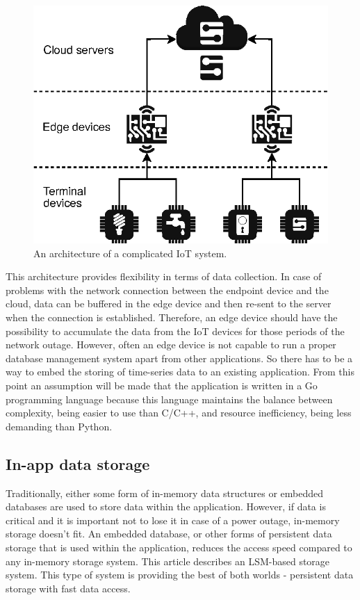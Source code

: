 \begin{figure}[htb]
\centering
\includegraphics{figures/iot-hierarchy.drawio.eps}
\caption{An architecture of a complicated IoT system.} \label{fig1}
\end{figure}

This architecture provides flexibility in terms of data collection.
In case of problems with the network connection between the endpoint device and the cloud, data can be buffered in the edge device and then re-sent to the server when the connection is established. Therefore, an edge device should have the possibility to accumulate the data from the IoT devices for those periods of the network outage. However, often an edge device is not capable to run a proper database management system apart from other applications. So there has to be a way to embed the storing of time-series data to an existing application. From this point an assumption will be made that the application is written in a Go programming language because this language maintains the balance between complexity, being easier to use than C/C++, and resource inefficiency, being less demanding than Python.

\subsection{In-app data storage}
Traditionally, either some form of in-memory data structures or embedded databases are used to store data within the application. However, if data is critical and it is important not to lose it in case of a power outage, in-memory storage doesn't fit. An embedded database, or other forms of persistent data storage that is used within the application, reduces the access speed compared to any in-memory storage system. This article describes an LSM-based storage system. This type of system is providing the best of both worlds - persistent data storage with fast data access.